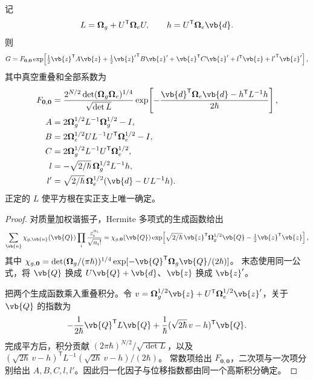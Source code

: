 \begin{proposition}[带归一化的振幅生成函数]
记
\[
 L=\boldsymbol\Omega_g+U^{\mathsf T}\boldsymbol\Omega_eU,
 \qquad h=U^{\mathsf T}\boldsymbol\Omega_e\vb{d}.
\]
则
\begin{equation}
 G=F_{\mathbf0,\mathbf0}
 \exp\!\left[
 \tfrac12\vb{z}^{\mathsf T}A\vb{z}
 +\tfrac12{\vb{z}'}^{\mathsf T}B\vb{z}'
 +\vb{z}^{\mathsf T}C\vb{z}'
 +l^{\mathsf T}\vb{z}+{l'}^{\mathsf T}\vb{z}'
 \right],
 \label{eq:doktorov-gaussian-generator}
\end{equation}
其中真空重叠和全部系数为
\begin{align*}
 F_{\mathbf0,\mathbf0}
 &=\frac{2^{N/2}\det(\boldsymbol\Omega_g\boldsymbol\Omega_e)^{1/4}}
         {\sqrt{\det L}}
   \exp\!\left[-\frac{\vb{d}^{\mathsf T}\boldsymbol\Omega_e\vb{d}
                      -h^{\mathsf T}L^{-1}h}{2\hbar}\right],\\
 A&=2\boldsymbol\Omega_g^{1/2}L^{-1}\boldsymbol\Omega_g^{1/2}-I,\\
 B&=2\boldsymbol\Omega_e^{1/2}UL^{-1}U^{\mathsf T}\boldsymbol\Omega_e^{1/2}-I,\\
 C&=2\boldsymbol\Omega_g^{1/2}L^{-1}U^{\mathsf T}\boldsymbol\Omega_e^{1/2},\\
 l&=-\sqrt{2/\hbar}\,\boldsymbol\Omega_g^{1/2}L^{-1}h,\\
 l'&=\sqrt{2/\hbar}\,\boldsymbol\Omega_e^{1/2}(\vb{d}-UL^{-1}h).
\end{align*}
正定的 $L$ 使平方根在实正支上唯一确定。
\end{proposition}
\begin{proof}
对质量加权谐振子，Hermite 多项式的生成函数给出
\[
 \sum_{\vb{n}}\chi_{g,\vb{n}}(\vb{Q})
 \prod_i\frac{z_i^{n_i}}{\sqrt{n_i!}}
 =\chi_{g,\mathbf0}(\vb{Q})
 \exp\!\left[\sqrt{2/\hbar}\,
 \vb{z}^{\mathsf T}\boldsymbol\Omega_g^{1/2}\vb{Q}
 -\tfrac12\vb{z}^{\mathsf T}\vb{z}\right],
\]
其中 $\chi_{g,\mathbf0}=\det(\boldsymbol\Omega_g/(\pi\hbar))^{1/4}
\exp[-\vb{Q}^{\mathsf T}\boldsymbol\Omega_g\vb{Q}/(2\hbar)]$。
末态使用同一公式，将 $\vb{Q}$ 换成 $U\vb{Q}+\vb{d}$、$\vb{z}$ 换成 $\vb{z}'$。

把两个生成函数乘入重叠积分。令
$v=\boldsymbol\Omega_g^{1/2}\vb{z}+U^{\mathsf T}\boldsymbol\Omega_e^{1/2}\vb{z}'$，关于 $\vb{Q}$ 的指数为
\[
 -\frac1{2\hbar}\vb{Q}^{\mathsf T}L\vb{Q}
 +\frac1\hbar(\sqrt{2\hbar}\,v-h)^{\mathsf T}\vb{Q}.
\]
完成平方后，积分贡献 $(2\pi\hbar)^{N/2}/\sqrt{\det L}$，以及
$(\sqrt{2\hbar}\,v-h)^{\mathsf T}L^{-1}(\sqrt{2\hbar}\,v-h)/(2\hbar)$。
常数项给出 $F_{\mathbf0,\mathbf0}$，二次项与一次项分别给出 $A,B,C,l,l'$。因此归一化因子与位移指数都由同一个高斯积分确定。
\end{proof}

